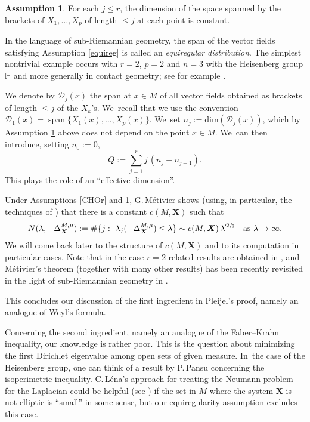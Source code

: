 \documentclass[11pt]{article}
\let\oldsfrac\sfrac
\renewcommand{\sfrac}[2]{{\oldsfrac{#1}{#2}}}
\DeclareMathOperator{\Span}{span}
\newcommand{\bX}{{\boldsymbol{X}}}
\theoremstyle{definition}
\newtheorem{assumption}[theorem]{Assumption}
\newcommand{\1}{\mathbbm{1}}
\numberwithin{equation}{section}
\begin{document}
\begin{assumption}\label{equireg}
For each $j\leq r$, the dimension of the space spanned by the brackets of $X_1,\ldots,X_p$ of length $\leq j$ at each point is constant.
\end{assumption}

In the language of sub-Riemannian geometry, the span of the vector fields satisfying Assumption \eqref{equireg} is called an \emph{equiregular distribution}. The simplest nontrivial example occurs with $r=2$, $p=2$ and $n=3$ with the Heisenberg group $\mathbb H$ and more generally in contact geometry; see for example \cite{AgBaBo,ArRi}.

We denote by $\mathcal{D}_j(x)$ the span at $x\in M$ of all vector fields obtained as brackets of length $\leq j$ of the $X_k$'s. We~recall that we use the convention $\mathcal D_1(x)=\allowbreak\Span\{X_1(x),\ldots,X_p(x)\}$. We~set $n_j :=\text{dim}(\mathcal{D}_j(x))$, which by Assumption \ref{equireg} above does not depend on the point $x\in M$. We~can then introduce, setting $n_0:=0$,\vspace*{-5pt}\enlargethispage{.5\baselineskip}
\begin{equation}\label{eq:defQ}
Q:= \sum_{j=1}^r j \,(n_j-n_{j-1}).
\end{equation}
This plays the role of an ``effective dimension''.

Under Assumptions \ref{CHOr} and \ref{equireg}, G.\,Métivier shows (using, in particular, the techniques of \cite{RS,Rot}) that there is a constant $c(M,\bX)$ such that\vspace*{-3pt}
\begin{equation}\label{MetForm1}
N(\lambda,-\Delta_\bX^{M,\mu}):= \# \{j:\ \lambda_j (-\Delta_\bX^{M,\mu}) \leq \lambda\} \sim c (M,\bX) \,\lambda^{\sfrac Q2}
\quad\text{as}\ \lambda\to\infty.
\end{equation}
We will come back later to the structure of $c (M,\bX)$ and to its computation in particular cases. Note that in the case $r=2$ related results are obtained in \cite{MS1,MS2,Me,Mo}, and Métivier's theorem (together with many other results) has been recently revisited in the light of sub-Riemannian geometry in \cite{CHT0,CHT,CHT1}.

This concludes our discussion of the first ingredient in Pleijel's proof, namely an analogue of Weyl's formula.

Concerning the second ingredient, namely an analogue of the Faber--Krahn inequality, our knowledge is rather poor. This is the question about minimizing the first Dirichlet eigenvalue among open sets of given measure. In~the case of the Heisenberg group, one can think of a result by P.\,Pansu \cite{Pa} concerning the isoperimetric inequality. C.\,Léna's approach \cite{Le} for treating the Neumann problem for the Laplacian could be helpful (see \cite{HS}) if the set in $M$ where the system $\bX$ is not elliptic is ``small'' in some sense, but our equiregularity assumption excludes this case.
\end{document}

